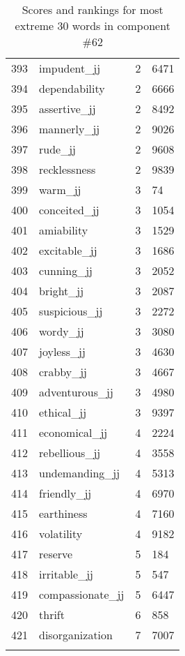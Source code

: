 \begin{longtable}[!htbp]{| rlr@{.}l |}
    393 & impudent\_jj & 2 & 6471 \\
    394 & dependability & 2 & 6666 \\
    395 & assertive\_jj & 2 & 8492 \\
    396 & mannerly\_jj & 2 & 9026 \\
    397 & rude\_jj & 2 & 9608 \\
    398 & recklessness & 2 & 9839 \\
    399 & warm\_jj & 3 & 74 \\
    400 & conceited\_jj & 3 & 1054 \\
    401 & amiability & 3 & 1529 \\
    402 & excitable\_jj & 3 & 1686 \\
    403 & cunning\_jj & 3 & 2052 \\
    404 & bright\_jj & 3 & 2087 \\
    405 & suspicious\_jj & 3 & 2272 \\
    406 & wordy\_jj & 3 & 3080 \\
    407 & joyless\_jj & 3 & 4630 \\
    408 & crabby\_jj & 3 & 4667 \\
    409 & adventurous\_jj & 3 & 4980 \\
    410 & ethical\_jj & 3 & 9397 \\
    411 & economical\_jj & 4 & 2224 \\
    412 & rebellious\_jj & 4 & 3558 \\
    413 & undemanding\_jj & 4 & 5313 \\
    414 & friendly\_jj & 4 & 6970 \\
    415 & earthiness & 4 & 7160 \\
    416 & volatility & 4 & 9182 \\
    417 & reserve & 5 & 184 \\
    418 & irritable\_jj & 5 & 547 \\
    419 & compassionate\_jj & 5 & 6447 \\
    420 & thrift & 6 & 858 \\
    421 & disorganization & 7 & 7007 \\
    \hline
    \caption{Scores and rankings for most extreme 30 words in component \#62} \\
\end{longtable}
